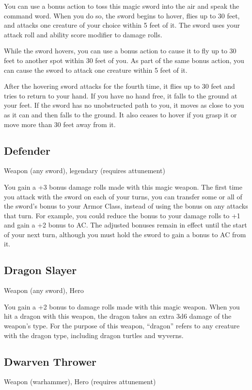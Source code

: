 You can use a bonus action to toss this magic sword into the air and speak the command word. When you do so, the sword begins to hover, flies up to 30 feet, and attacks one creature of your choice within 5 feet of it. The sword uses your attack roll and ability score modifier to damage rolls.

While the sword hovers, you can use a bonus action to cause it to fly up to 30 feet to another spot within 30 feet of you. As part of the same bonus action, you can cause the sword to attack one creature within 5 feet of it.

After the hovering sword attacks for the fourth time, it flies up to 30 feet and tries to return to your hand. If you have no hand free, it falls to the ground at your feet. If the sword has no unobstructed path to you, it moves as close to you as it can and then falls to the ground. It also ceases to hover if you grasp it or move more than 30 feet away from it.

\subsection{Defender}
Weapon (any sword), legendary (requires attunement)

You gain a +3 bonus damage rolls made with this magic weapon. The first time you attack with the sword on each of your turns, you can transfer some or all of the sword's bonus to your Armor Class, instead of using the bonus on any attacks that turn. For example, you could reduce the bonus to your damage rolls to +1 and gain a +2 bonus to AC. The adjusted bonuses remain in effect until the start of your next turn, although you must hold the sword to gain a bonus to AC from it.

\subsection{Dragon Slayer}
Weapon (any sword), Hero 

You gain a +2 bonus to damage rolls made with this magic weapon.  When you hit a dragon with this weapon, the dragon takes an extra 3d6 damage of the weapon's type. For the purpose of this weapon, “dragon” refers to any creature with the dragon type, including dragon turtles and wyverns.

\subsection{Dwarven Thrower}
Weapon (warhammer), Hero (requires attunement) 

